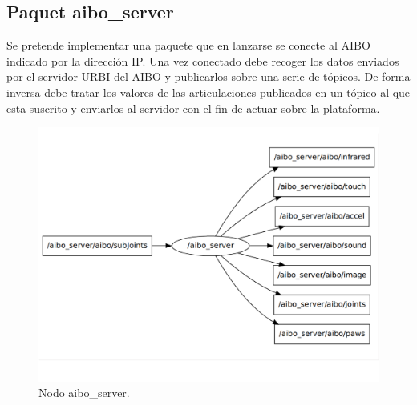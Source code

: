 \documentclass[12pt,a4paper,final,twoside]{article}
\begin{document}
\subsection{Paquet aibo{\_}server }
Se pretende implementar una paquete que en lanzarse se conecte al AIBO indicado por la dirección IP. Una vez conectado debe recoger los datos enviados por el servidor URBI del AIBO y publicarlos sobre una serie de tópicos. De forma inversa debe tratar los valores de las articulaciones publicados en un tópico al que esta suscrito y enviarlos al servidor con el fin de actuar sobre la plataforma.

\begin{figure}[H]
	\centering
    \includegraphics[scale=0.7]{images/aiboserverNodo.pdf}
	 \caption{Nodo aibo{\_}server.}
  \label{fig:aiboserv}
\end{figure}
\end{document}

